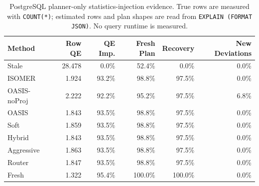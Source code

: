 \begin{table}[t]
  \centering
  \small
  \caption{PostgreSQL planner-only statistics-injection evidence. True rows are measured with \texttt{COUNT(*)}; estimated rows and plan shapes are read from \texttt{EXPLAIN (FORMAT JSON)}. No query runtime is measured.}
  \label{tab:postgres_planner_stats_injection}
  \setlength{\tabcolsep}{4pt}
  \begin{tabular}{lrrrrr}
    \toprule
    Method & Row QE & QE Imp. & Fresh Plan & Recovery & New Deviations \\
    \midrule
    Stale & 28.478 & 0.0\% & 52.4\% & 0.0\% & 0.0\% \\
    ISOMER & 1.924 & 93.2\% & 98.8\% & 97.5\% & 0.0\% \\
    OASIS-noProj & 2.222 & 92.2\% & 95.2\% & 97.5\% & 6.8\% \\
    OASIS & 1.843 & 93.5\% & 98.8\% & 97.5\% & 0.0\% \\
    Soft & 1.859 & 93.5\% & 98.8\% & 97.5\% & 0.0\% \\
    Hybrid & 1.843 & 93.5\% & 98.8\% & 97.5\% & 0.0\% \\
    Aggressive & 1.863 & 93.5\% & 98.8\% & 97.5\% & 0.0\% \\
    Router & 1.847 & 93.5\% & 98.8\% & 97.5\% & 0.0\% \\
    Fresh & 1.322 & 95.4\% & 100.0\% & 100.0\% & 0.0\% \\
    \bottomrule
  \end{tabular}
\end{table}
